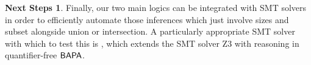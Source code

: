 \documentclass[letterpaper]{article} %
\theoremstyle{definition}
\newtheorem*{nextsteps*}{Next Steps}
\newcommand{\semantics}[1]{[\![\mbox{\em $ #1 $\/}]\!]}
\newcommand{\rem}[1]{\relax}
\newcommand{\Aunion}{\mathscr{A}^{\cup}}
\newcommand{\Sunion}{\mathscr{S}^{\cup}}
\newcommand{\Sinter}{\mathscr{S}^{\cap}}
\newcommand{\BAPA}{\sf{BAPA}}
\newcommand{\proverule}{\textsc}
\newcommand{\Some}[2]{\mathsf{Some}\,\,#1\,\,#2}
\newcommand{\Atleast}[2]{\mathsf{AtLeast}\,\,#1\,\,#2}
\newcommand{\More}[2]{\mathsf{More}\,\,#1\,\,#2}
\newcommand{\SomeNoArgs}{\mathsf{Some}}
\newcommand{\AtleastNoArgs}{\mathsf{AtLeast}}
\newcommand{\MoreNoArgs}{\mathsf{More}}
\newcommand{\card}{\mathrm{card}}
\newcommand{\noproof}{\rem}
\begin{document}
\begin{nextsteps*}
\noproof{
To see that this is a sound rule of inference, suppose that $\Gamma \not \models \Some{a}{c}$.  So
\[
\begin{array}{lclr}
|\semantics{a \cup c}| & = & |\semantics{a}| + |\semantics{c}| & (\textrm{since } \semantics{a} \cap \semantics{c} = \emptyset) \\

& > & |\semantics{b}| + |\semantics{d}| &
(\textrm{since } \Gamma \models \More{a}{b}, \Gamma \models \Atleast{c}{d}) \\

& \ge & |\semantics{b \cup d}| & 
\end{array}
\]
but $\Gamma \models \Atleast{(b \cup d)}{(a \cup c)}$, so $|\semantics{b \cup d}| \ge |a \cup c|$.  This is a contradiction.  So $\Gamma \models \Some{a}{c}$.  This rule is also not provable from those of either $\Aunion(\card)$ or $\Sunion$.
}
\noproof{
Note that a special case of this rule is
\[
\infer[(\proverule{more-some})]
    {\Some{a}{a}}
    {\More{a}{b}}
\]
which is a key rule relating $\SomeNoArgs$- and $\MoreNoArgs$-sentences in \cite{syllogistic_cardinality_comparisons}.
}


Finally, our two main logics can be integrated with SMT solvers in order to efficiently automate those inferences which just involve sizes and subset alongside union or intersection.  A particularly appropriate SMT solver with which to test this is \cite{cardinality_constraints_smt}, which extends the SMT solver Z$3$ with reasoning in quantifier-free $\BAPA$.



\end{nextsteps*}
\end{document}
